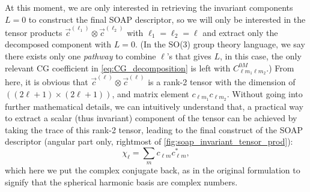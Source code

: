 \begin{myquote}
\hspace{10pt} At this moment, we are only interested in retrieving the invariant components $L=0$ to construct the final SOAP descriptor,\cite{bartok2013representing} so we will only be interested in the tensor products $\vec{c}^{(\ell_1)}\otimes\vec{c}^{(\ell_2)}$ with $\ell_1=\ell_2=\ell$ and extract only the decomposed component with $L=0$. (In the SO(3) group theory language, we say there exists only one \emph{pathway} to combine $\ell$'s that gives $L$, in this case, the only relevant CG coefficient in \cref{eq:CG_decomposition} is left with $C^{0M}_{\ell m_1\ell m_2}$.) From here, it is obvious that $\vec{c}^{(\ell)}\otimes\vec{c}^{(\ell)}$ is a rank-2 tensor with the dimension of $((2\ell+1)\times(2\ell+1))$, and matrix element $c_{\ell m_1}c_{\ell m_2}$. Without going into further mathematical details, we can intuitively understand that, a practical way to extract a scalar (thus invariant) component of the tensor can be achieved by taking the trace of this rank-2 tensor, leading to the final construct of the SOAP descriptor (angular part only, rightmost of \cref{fig:soap_invariant_tensor_prod}):
\begin{equation*}
\chi_{\ell}=\sum_{m}c_{\ell m}c^{*}_{\ell m},
\end{equation*}
which here we put the complex conjugate back, as in the original formulation\cite{bartok2010gaussian} to signify that the spherical harmonic basis are complex numbers.


\end{myquote}

